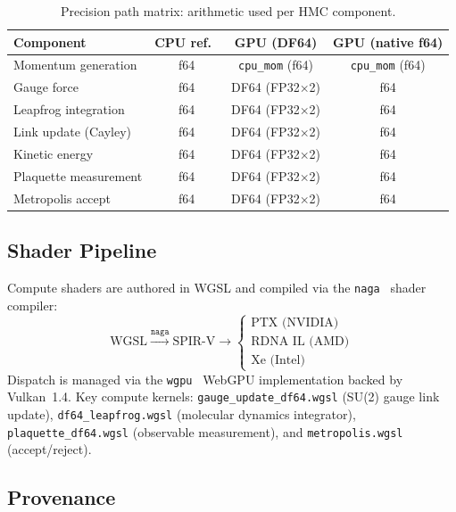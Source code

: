 \documentclass[aps,prl,twocolumn,superscriptaddress,showpacs]{revtex4-2}
\begin{document}
\begin{table}[h]
\caption{Precision path matrix: arithmetic used per HMC component.}
\label{tab:precmatrix}
\begin{ruledtabular}
\begin{tabular}{lccc}
Component & CPU ref.\ & GPU (DF64) & GPU (native f64) \\
\midrule
Momentum generation & f64 & \texttt{cpu\_mom} (f64) & \texttt{cpu\_mom} (f64) \\
Gauge force          & f64 & DF64 (FP32$\times$2) & f64 \\
Leapfrog integration & f64 & DF64 (FP32$\times$2) & f64 \\
Link update (Cayley) & f64 & DF64 (FP32$\times$2) & f64 \\
Kinetic energy       & f64 & DF64 (FP32$\times$2) & f64 \\
Plaquette measurement & f64 & DF64 (FP32$\times$2) & f64 \\
Metropolis accept    & f64 & DF64 (FP32$\times$2) & f64 \\
\end{tabular}
\end{ruledtabular}
\end{table}

\subsection{Shader Pipeline}

Compute shaders are authored in WGSL and compiled via the
\texttt{naga}~\cite{naga} shader compiler:
\begin{equation*}
  \text{WGSL} \xrightarrow{\texttt{naga}} \text{SPIR-V}
    \rightarrow \begin{cases}
      \text{PTX (NVIDIA)} \\
      \text{RDNA IL (AMD)} \\
      \text{Xe (Intel)}
    \end{cases}
\end{equation*}
Dispatch is managed via the \texttt{wgpu}~\cite{wgpu} WebGPU
implementation backed by Vulkan~1.4. Key compute kernels:
\texttt{gauge\_update\_df64.wgsl} (SU(2) gauge link update),
\texttt{df64\_leapfrog.wgsl} (molecular dynamics integrator),
\texttt{plaquette\_df64.wgsl} (observable measurement), and
\texttt{metropolis.wgsl} (accept/reject).

\subsection{Provenance}
\end{document}
